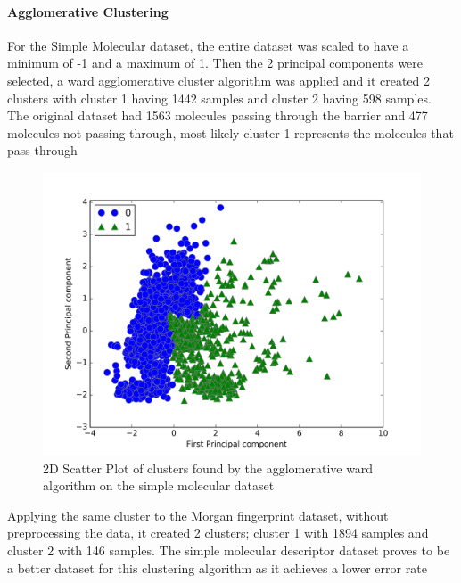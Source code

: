 \documentclass[a4paper,12pt]{report}
\begin{document}
				\paragraph{Agglomerative Clustering}
				For the Simple Molecular dataset, the entire dataset was scaled to have a minimum of -1 and a maximum of 1. Then the 2 principal components were selected, a ward agglomerative cluster algorithm was applied and it created 2 clusters with cluster 1 having 1442 samples and cluster 2 having 598 samples. The original dataset had 1563 molecules passing through the barrier and 477 molecules not passing through, most likely cluster 1 represents the molecules that pass through
					\begin{figure}[H]
						\centering
						\includegraphics[width=\textwidth,scale=1,totalheight=0.4\textheight]{images/agg_smd_scatter}
						\caption{2D Scatter Plot of clusters found by the agglomerative ward algorithm on the simple molecular dataset}
						\label{fig:agg_smd_scatter}
					\end{figure}
				Applying the same cluster to the Morgan fingerprint dataset, without preprocessing the data, it created 2 clusters; cluster 1 with 1894 samples and cluster 2 with 146 samples. The simple molecular descriptor dataset proves to be a better dataset for this clustering algorithm as it achieves a lower error rate
\end{document}
